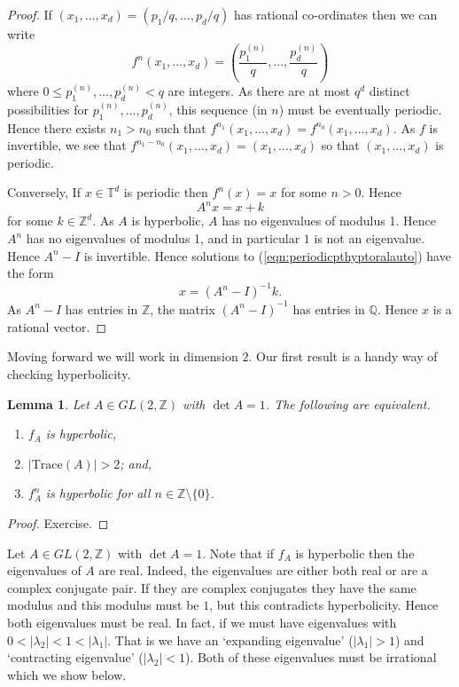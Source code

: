 \documentclass[12pt]{article}
\newtheorem{lemma}[theorem]{Lemma}
\theoremstyle{definition}
\theoremstyle{remark}
\begin{document}
\begin{proof}
If $(x_{1},\ldots,x_{d}) = (p_{1}/q,\ldots, p_{d}/q)$ has rational co-ordinates then
we can write 
\[
 f^{n}(x_{1},\ldots,x_{d}) = \left( \frac{p_{1}^{(n)}}{q},\ldots,
 \frac{p_{d}^{(n)}}{q} \right)
\]
where $0 \leq p_{1}^{(n)}, \ldots, p_{d}^{(n)} < q$ are integers.  As there are
at most $q^{d}$ distinct possibilities for $p_{1}^{(n)},\ldots, p_{d}^{(n)}$,
this sequence (in $n$) must be eventually periodic.  Hence there
exists $n_{1}>n_{0}$ such that $f^{n_{1}}(x_{1},\ldots,x_{d}) =
f^{n_{0}}(x_{1},\ldots,x_{d})$.  As $f$ is invertible, we see that
$f^{n_{1}-n_{0}}(x_{1},\ldots,x_{d}) = (x_{1},\ldots,x_{d})$ so that $(x_{1},\ldots,x_{d})$
is periodic.

Conversely, If $x \in \mathbb T^d$ is periodic then $f^{n}
(x) = x$ for some $n>0$.  Hence
\begin{equation}
\label{eqn:periodicpthyptoralauto}
 A^{n}x
 = x +
   k
\end{equation}
for some $k \in \mathbb Z^d$.  As $A$ is hyperbolic, $A$ has no
eigenvalues of modulus 1.  Hence $A^{n}$ has no eigenvalues of modulus
1, and in particular $1$ is not an eigenvalue.  Hence $A^{n}-I$ is
invertible.  Hence solutions to (\ref{eqn:periodicpthyptoralauto})
have the form
\[
x
 = (A^{n}-I)^{-1} 
 k.
\]
As $A^{n}-I$ has entries in $\mathbb Z$, the matrix $(A^{n}-I)^{-1}$ has
entries in $\mathbb Q$.  Hence $x$ is a rational vector.
\end{proof}

Moving forward we will work in dimension $2$. Our first result is a handy way of checking hyperbolicity.
\begin{lemma}
Let $A \in GL(2,\mathbb Z)$ with $\det A=1$. The following are equivalent.
\begin{enumerate}
\item  $f_A$ is hyperbolic,
\item $|\mathrm{Trace}(A)|>2$; and,
\item $f_A^n$ is hyperbolic for all $n \in \mathbb Z\setminus \{0\}$.
\end{enumerate}
\end{lemma}

\begin{proof}
Exercise.
\end{proof}

Let $A \in GL(2,\mathbb{Z})$ with $\det A = 1$. Note that if $f_A$ is hyperbolic then the eigenvalues of $A$ are real. Indeed, the eigenvalues are either both real or are a complex conjugate pair. If they are complex conjugates they have the same modulus and this modulus must be $1$, but this contradicts hyperbolicity. Hence both eigenvalues must be real. In fact, if we must have eigenvalues with $0 <  |\lambda_2| < 1 < |\lambda_1|$. That is we have an `expanding eigenvalue' ($|\lambda_1| >1$)  and `contracting eigenvalue' ($|\lambda_2| < 1$). Both of these eigenvalues must be irrational which we show below. 
\end{document}
